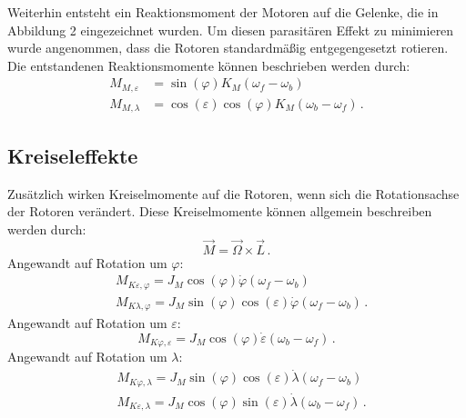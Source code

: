 \documentclass[10pt,twocolumn]{article}
\begin{document}
	Weiterhin entsteht ein Reaktionsmoment der Motoren auf die Gelenke, die in Abbildung 2 eingezeichnet wurden. Um diesen parasitären Effekt zu minimieren wurde angenommen, dass die Rotoren standardmäßig entgegengesetzt rotieren. Die entstandenen Reaktionsmomente können beschrieben werden durch:
	\begin{subequations}		
		\begin{align}
		M_{M,\varepsilon} &=\sin (\varphi) K_M (\omega_f-\omega_b) \\
		M_{M,\lambda} &=\cos (\varepsilon) \cos (\varphi) K_M (\omega_b-\omega_f)\, .
		\end{align}
	\end{subequations}
	
	
	\subsection{Kreiseleffekte}
	
	Zusätzlich wirken Kreiselmomente auf die Rotoren, wenn sich die Rotationsachse der Rotoren verändert. Diese Kreiselmomente können allgemein beschreiben werden durch:
	\begin{equation}
	\vec{M} = \vec{\Omega} \times \vec{L}\, .
	\end{equation}	
	Angewandt auf Rotation um $\varphi$:
	\begin{subequations}
		\begin{align}
		&M_{K\varepsilon,\varphi} = J_M \cos (\varphi) \dot{\varphi}(\omega_f-\omega_b)\\
		&M_{K\lambda,\varphi} = J_M \sin (\varphi) \cos (\varepsilon) \dot{\varphi}(\omega_f-\omega_b)\, .
		\end{align}
	\end{subequations}
	Angewandt auf Rotation um $\varepsilon$:
	\begin{equation}
	M_{K\varphi,\varepsilon} = J_M \cos (\varphi) \dot{\varepsilon}(\omega_b-\omega_f)\, .
	\end{equation}
	Angewandt auf Rotation um $\lambda$:
	\begin{subequations}
		\begin{align}
		&M_{K\varphi,\lambda} = J_M \sin (\varphi) \cos (\varepsilon) \dot{\lambda}(\omega_f-\omega_b)\\
		&M_{K\varepsilon,\lambda} = J_M \cos (\varphi) \sin (\varepsilon) \dot{\lambda}(\omega_b-\omega_f)\, .
		\end{align}
	\end{subequations}
	
\end{document}
